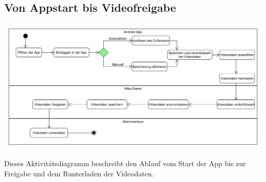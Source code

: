 \subsection{Von Appstart bis Videofreigabe}
\begin{center}
\includegraphics[width=1\textwidth]{subtopicsFuncspec/Res/systemModels/AKDiagramm.png}
\end{center}
Dieses Aktivitätsdiagramm beschreibt den Ablauf vom Start der \gls{App} bis zur Freigabe und dem Runterladen der Videodaten. 
